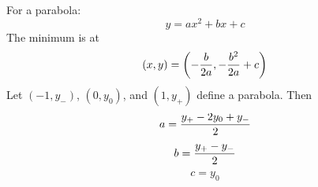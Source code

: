 \documentclass{article}
\begin{document}
For a parabola:
$$
y = ax^2 + bx + c
$$
The minimum is at
$$
(x,y) = \left( -{b \over 2a}, -{b^2\over2a} + c   \right)
$$
Let $(-1,y_-)$, $(0,y_0)$, and $(1,y_+)$ define a parabola. Then
$$
a = {y_+ - 2y_0 + y_- \over 2}
$$
$$
b = {y_+ - y_- \over 2}
$$
$$
c = y_0
$$
\end{document}
